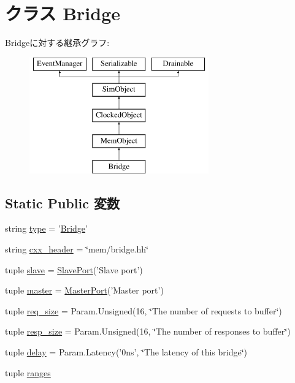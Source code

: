 \hypertarget{classBridge_1_1Bridge}{
\section{クラス Bridge}
\label{classBridge_1_1Bridge}
}
Bridgeに対する継承グラフ:\begin{figure}[H]
\begin{center}
\leavevmode
\includegraphics[height=5cm]{classBridge_1_1Bridge}
\end{center}
\end{figure}
\subsection*{Static Public 変数}
\begin{DoxyCompactItemize}
\item 
string \hyperlink{classBridge_1_1Bridge_acce15679d830831b0bbe8ebc2a60b2ca}{type} = '\hyperlink{classBridge_1_1Bridge}{Bridge}'
\item 
string \hyperlink{classBridge_1_1Bridge_a17da7064bc5c518791f0c891eff05fda}{cxx\_\-header} = \char`\"{}mem/bridge.hh\char`\"{}
\item 
tuple \hyperlink{classBridge_1_1Bridge_a9b8cb1f697e86858437a78f041478c9b}{slave} = \hyperlink{classSlavePort}{SlavePort}('Slave port')
\item 
tuple \hyperlink{classBridge_1_1Bridge_a0f74d64e6817f0f89bafc52ff3c56cbb}{master} = \hyperlink{classMasterPort}{MasterPort}('Master port')
\item 
tuple \hyperlink{classBridge_1_1Bridge_a750557f752c49cbd47651bb4d0798075}{req\_\-size} = Param.Unsigned(16, \char`\"{}The number of requests to buffer\char`\"{})
\item 
tuple \hyperlink{classBridge_1_1Bridge_adfe2ddbc99cf4426ac41767c4b98258c}{resp\_\-size} = Param.Unsigned(16, \char`\"{}The number of responses to buffer\char`\"{})
\item 
tuple \hyperlink{classBridge_1_1Bridge_ac1ab55b34347f0110eb273c9d47d52e2}{delay} = Param.Latency('0ns', \char`\"{}The latency of this bridge\char`\"{})
\item 
tuple \hyperlink{classBridge_1_1Bridge_abe08d3b07d6b72953260a39c8428ecf5}{ranges}
\end{DoxyCompactItemize}


